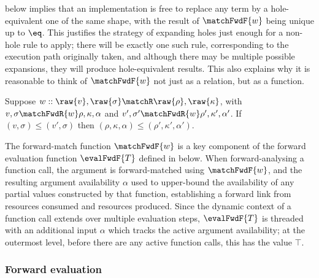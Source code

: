 \vspace{2mm}
\noindent {} below implies that an implementation is free to replace any term by a hole-equivalent one of the same shape, with the result of $\matchFwdF{w}$ being unique up to $\eq$. This justifies the strategy of expanding holes just enough for a non-hole rule to apply; there will be exactly one such rule, corresponding to the execution path originally taken, and although there may be multiple possible expansions, they will produce hole-equivalent results. This also explains why it is reasonable to think of $\matchFwdF{w}$ not just as a relation, but as a function.

\begin{lemma}
\label{lem:match-fwd:monotonic}
   Suppose $w :: \raw{v}, \raw{\sigma} \matchR \raw{\rho}, \raw{\kappa}$, with $v, \sigma \matchFwdR{w} \rho, \kappa, \alpha$ and $v', \sigma' \matchFwdR{w} \rho', \kappa', \alpha'$. If $(v, \sigma) \leq (v', \sigma)$ then $(\rho, \kappa, \alpha) \leq (\rho', \kappa', \alpha')$.
\end{lemma}



The forward-match function $\matchFwdF{w}$ is a key component of the forward evaluation function $\evalFwdF{T}$ defined in  below. When forward-analysing a function call, the argument is forward-matched using $\matchFwdF{w}$, and the resulting argument availability $\alpha$ used to upper-bound the availability of any partial values constructed by that function, establishing a forward link from resources consumed and resources produced. Since the dynamic context of a function call extends over multiple evaluation steps, $\evalFwdF{T}$ is threaded with an additional input $\alpha$ which tracks the active argument availability; at the outermost level, before there are any active function calls, this has the value $\top$.

\subsubsection{Forward evaluation}
\label{sec:data-dependencies:forward-eval}

